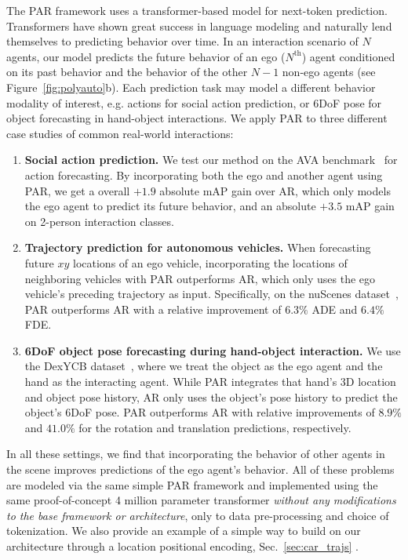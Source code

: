 The PAR framework uses a transformer-based model for next-token prediction. Transformers have shown great success in language modeling and naturally lend themselves to predicting behavior over time. In an  interaction scenario of $N$ agents, our model predicts the future behavior of an ego ($N^{\text{th}}$) agent conditioned on its past behavior and the behavior of the other $N-1$ non-ego agents (see Figure~\ref{fig:polyauto}b). 
Each prediction task may model a different behavior modality of interest, e.g. actions for social action prediction, or 6DoF pose for object forecasting in hand-object interactions. We apply PAR to three different case studies of common real-world interactions: 
 \begin{enumerate}
     \item  \textbf{Social action prediction.} We test our method on the AVA benchmark~\cite{gu2018ava} for action forecasting. By incorporating both the ego and another agent using PAR, we get a overall $+1.9$ absolute mAP gain over AR, which only models the ego agent to predict its future behavior, and an absolute $+3.5$ mAP gain on 2-person interaction classes.
     \item \textbf{Trajectory prediction for autonomous vehicles.} When forecasting future $xy$ locations of an ego vehicle, incorporating the locations of neighboring vehicles with PAR outperforms AR, which only uses the ego vehicle's preceding trajectory as input. Specifically, on the nuScenes dataset~\cite{nuscenes}, PAR outperforms AR with a relative improvement of $6.3\%$ ADE and $6.4\%$ FDE. 
     \item \textbf{6DoF object pose forecasting during hand-object interaction.} We use the DexYCB dataset~\cite{chao2021dexycb}, where we treat the object as the ego agent and the hand as the interacting agent. While PAR integrates that hand's 3D location and object pose history, AR only uses the object's pose history to predict the object's 6DoF pose. PAR outperforms AR with relative improvements of $8.9\%$ and $41.0\%$ for the rotation and translation predictions, respectively.
 \end{enumerate}

In all these settings, we find that incorporating the behavior of other agents in the scene improves predictions of the ego agent's behavior.
All of these problems are modeled via the same simple PAR framework and implemented using the same proof-of-concept 4 million parameter transformer \textit{without any modifications to the base framework or architecture}, only to data pre-processing and choice of tokenization. We also provide an example of a simple way to build on our architecture through a location positional encoding, Sec.~\ref{sec:car_trajs}
.


